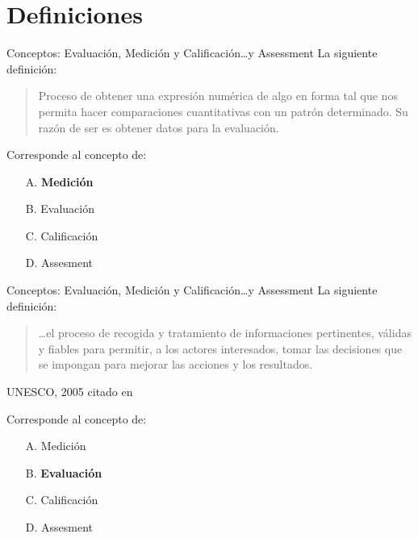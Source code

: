 \documentclass[11pt, aspectratio=169, xcolor=table]{beamer}
\begin{document}
	\section{Definiciones}

	\begin{frame}{Conceptos: Evaluación, Medición y Calificación…y Assessment}
		La siguiente definición:
		\begin{quote}
		Proceso de obtener una expresión numérica de algo en forma tal que nos permita hacer comparaciones cuantitativas con un patrón determinado. Su razón de ser es obtener datos para la evaluación.
		\end{quote}
		\begin{flushright}
			\cite{ROSALES2014}
		\end{flushright}
		Corresponde al concepto de:
		\begin{enumerate}
			\item[A.] \textbf<2->{Medición}
			\item[B.] Evaluación
			\item[C.]Calificación
			\item[D.] Assesment
		\end{enumerate}
	\end{frame}

	\begin{frame}{Conceptos: Evaluación, Medición y Calificación…y Assessment}
		La siguiente definición:
		\begin{quote}
			\dots el proceso de recogida y tratamiento de informaciones pertinentes, válidas y fiables para permitir, a los actores interesados, tomar las decisiones que se impongan para mejorar las acciones y los resultados.
		\end{quote}
		\begin{flushright}
			UNESCO, 2005 citado en \cite{ROSALES2014}
		\end{flushright}
			Corresponde al concepto de:
		\begin{enumerate}
			\item[A.] Medición
			\item[B.] \textbf<2->{Evaluación}
			\item[C.] Calificación
			\item[D.] Assesment
		\end{enumerate}		
	\end{frame}
\end{document}
